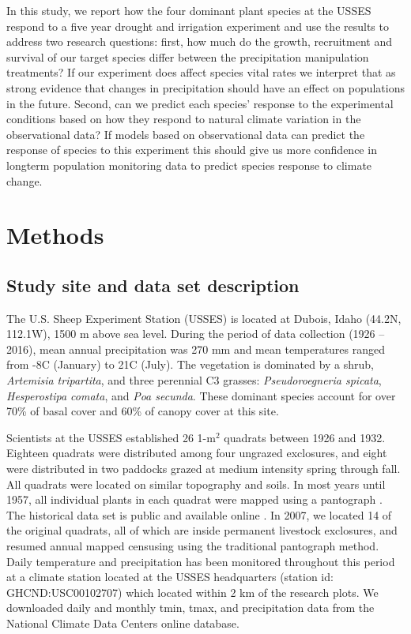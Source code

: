 \documentclass[11pt]{article}
\begin{document}
\begin{doublespacing}
In this study, we report how the four dominant plant species at the USSES respond to a five year drought and irrigation experiment and use the results to address two research questions: first, how much do the growth, recruitment and survival of our target species differ between the precipitation manipulation treatments? If our experiment does affect species vital rates we interpret that as strong evidence that changes in precipitation should have an effect on populations in the future. Second, can we predict each species' response to the experimental conditions based on how they respond to natural climate variation in the observational data? If models based on observational data can predict the response of species to this experiment this should give us more confidence in longterm population monitoring data to predict species response to climate change. 

\section*{Methods}

\subsection*{Study site and data set description}

The U.S. Sheep Experiment Station (USSES) is located at Dubois, Idaho (44.2\degree N, 112.1\degree W), 1500 m above sea level. During the period of data collection (1926 – 2016), mean annual precipitation was 270 mm and mean temperatures ranged from -8\degree C (January) to 21\degree C (July). The vegetation is dominated by a shrub, \textit{Artemisia tripartita}, and three perennial C3 grasses: \textit{Pseudoroegneria spicata}, \textit{Hesperostipa comata}, and \textit{Poa secunda}. These dominant species account for over 70\% of basal cover and 60\% of canopy cover at this site. 

Scientists at the USSES established 26 1-m$^2$ quadrats between 1926 and 1932. Eighteen quadrats were distributed among four ungrazed exclosures, and eight were distributed in two paddocks grazed at medium intensity spring through fall. All quadrats were located on similar topography and soils. In most years until 1957, all individual plants in each quadrat were mapped using a pantograph \citep{blaisdell_seasonal_1958}. The historical data set is public and available online \citep{zachmann_mapped_2010}. In 2007, we located 14 of the original quadrats, all of which are inside permanent livestock exclosures, and resumed annual mapped censusing using the traditional pantograph method. Daily temperature and precipitation has been monitored throughout this period at a climate station located at the USSES headquarters (station id: GHCND:USC00102707) which located within 2 km of the research plots.  We downloaded daily and monthly tmin, tmax, and precipitation data from the National Climate Data Centers online database.  


\end{doublespacing}
\end{document}
